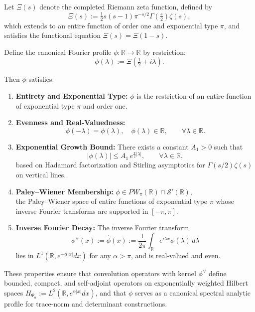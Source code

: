\begin{definition}
\label{def:canonical_fourier_profile}
Let \( \Xi(s) \) denote the completed Riemann zeta function, defined by
\[
\Xi(s) := \tfrac{1}{2} s(s-1) \pi^{-s/2} \Gamma\left(\tfrac{s}{2}\right) \zeta(s),
\]
which extends to an entire function of order one and exponential type \( \pi \), and satisfies the functional equation \( \Xi(s) = \Xi(1 - s) \).

Define the canonical Fourier profile \( \phi : \mathbb{R} \to \mathbb{R} \) by restriction:
\[
\phi(\lambda) := \Xi\left( \tfrac{1}{2} + i\lambda \right).
\]

Then \( \phi \) satisfies:
\begin{enumerate}
  \item \textbf{Entirety and Exponential Type:} \( \phi \) is the restriction of an entire function of exponential type \( \pi \) and order one.

  \item \textbf{Evenness and Real-Valuedness:}
  \[
  \phi(-\lambda) = \phi(\lambda), \quad \phi(\lambda) \in \mathbb{R}, \qquad \forall \lambda \in \mathbb{R}.
  \]

  \item \textbf{Exponential Growth Bound:} There exists a constant \( A_1 > 0 \) such that
  \[
  |\phi(\lambda)| \le A_1\, e^{\frac{\pi}{2} |\lambda|}, \qquad \forall \lambda \in \mathbb{R},
  \]
  based on Hadamard factorization and Stirling asymptotics for \( \Gamma(s/2) \zeta(s) \) on vertical lines.

  \item \textbf{Paley--Wiener Membership:}
\( \phi \in PW_\pi(\mathbb{R}) \cap \mathcal{S}'(\mathbb{R}) \),\\
the Paley--Wiener space of entire functions of exponential type \( \pi \)
whose inverse Fourier transforms are supported in \( [-\pi, \pi] \).

  \item \textbf{Inverse Fourier Decay:} The inverse Fourier transform
  \[
  \phi^\vee(x) := \widehat{\phi}(x) := \frac{1}{2\pi} \int_{\mathbb{R}} e^{i \lambda x} \phi(\lambda)\, d\lambda
  \]
  lies in \( L^1(\mathbb{R}, e^{-\alpha |x|} dx) \) for any \( \alpha > \pi \), and is real-valued and even.
\end{enumerate}

\noindent
These properties ensure that convolution operators with kernel \( \phi^\vee \) define bounded, compact, and self-adjoint operators on exponentially weighted Hilbert spaces \( H_{\Psi_\alpha} := L^2(\mathbb{R}, e^{\alpha |x|} dx) \), and that \( \phi \) serves as a canonical spectral analytic profile for trace-norm and determinant constructions.
\end{definition}
% 